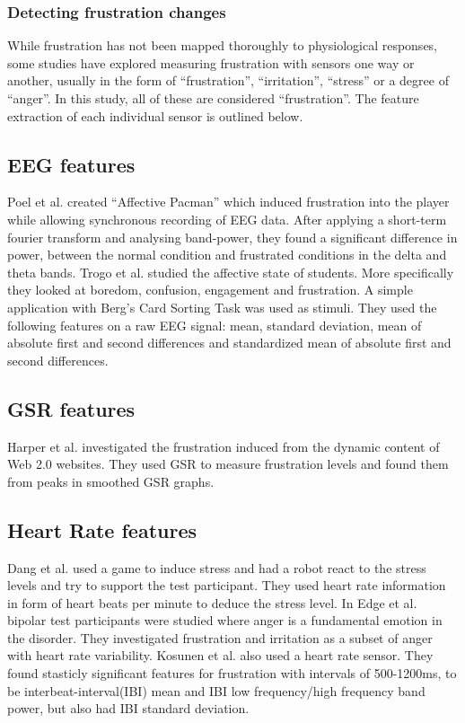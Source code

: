 \subsubsection{Detecting frustration changes}
While frustration has not been mapped thoroughly to physiological responses, some studies have explored measuring frustration with sensors one way or another, usually in the form of ``frustration'', ``irritation'', ``stress'' or a degree of ``anger''. In this study, all of these are considered ``frustration''. 
The feature extraction of each individual sensor is outlined below.

\subsection{EEG features}
Poel et al. \cite{affective_pacman} created ``Affective Pacman'' which induced frustration into the player while allowing synchronous recording of EEG data. After applying a short-term fourier transform and analysing band-power, they found a significant difference in power, between the normal condition and frustrated conditions in the delta and theta bands.
Trogo et al. \cite{brainwave_signals_frustration} studied the affective state of students. More specifically they looked at boredom, confusion, engagement and frustration. 
A simple application with Berg's Card Sorting Task\cite{bergs_card_sorting} was used as stimuli.
They used the following features on a raw EEG signal: mean, standard deviation, mean of absolute first and second differences and standardized mean of absolute first and second differences.

\subsection{GSR features}
Harper et al. \cite{web20_frustration} investigated the frustration induced from the dynamic content of Web 2.0 websites. 
They used GSR to measure frustration levels and found them from peaks in smoothed GSR graphs.

\subsection{Heart Rate features}
Dang et al.\cite{stress_robot} used a game to induce stress and had a robot react to the stress levels and try to support the test participant. 
They used heart rate information in form of heart beats per minute to deduce the stress level.
In Edge et al. \cite{bipolar_frustration} bipolar test participants were studied where anger is a fundamental emotion in the disorder. 
They investigated frustration and irritation as a subset of anger with heart rate variability.
Kosunen et al. \cite{boredom_negative_mood_features} also used a heart rate sensor.
They found stasticly significant features for frustration with intervals of 500-1200ms, to be interbeat-interval(IBI) mean and IBI low frequency/high frequency band power, but also had IBI standard deviation.


